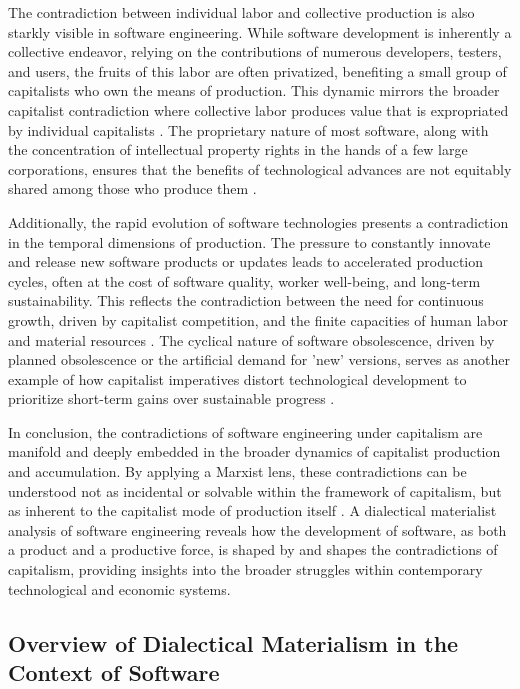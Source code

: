 \begin{refsection}
The contradiction between individual labor and collective production is also starkly visible in software engineering. While software development is inherently a collective endeavor, relying on the contributions of numerous developers, testers, and users, the fruits of this labor are often privatized, benefiting a small group of capitalists who own the means of production. This dynamic mirrors the broader capitalist contradiction where collective labor produces value that is expropriated by individual capitalists \cite[pp.~42-47]{fuchs2014}. The proprietary nature of most software, along with the concentration of intellectual property rights in the hands of a few large corporations, ensures that the benefits of technological advances are not equitably shared among those who produce them \cite[pp.~118-122]{benkler2010}.

Additionally, the rapid evolution of software technologies presents a contradiction in the temporal dimensions of production. The pressure to constantly innovate and release new software products or updates leads to accelerated production cycles, often at the cost of software quality, worker well-being, and long-term sustainability. This reflects the contradiction between the need for continuous growth, driven by capitalist competition, and the finite capacities of human labor and material resources \cite[pp.~89-93]{caffentzis2013}. The cyclical nature of software obsolescence, driven by planned obsolescence or the artificial demand for 'new' versions, serves as another example of how capitalist imperatives distort technological development to prioritize short-term gains over sustainable progress \cite[pp.~107-112]{mosco2011}.

In conclusion, the contradictions of software engineering under capitalism are manifold and deeply embedded in the broader dynamics of capitalist production and accumulation. By applying a Marxist lens, these contradictions can be understood not as incidental or solvable within the framework of capitalism, but as inherent to the capitalist mode of production itself \cite[pp.~1-25]{marx2008}. A dialectical materialist analysis of software engineering reveals how the development of software, as both a product and a productive force, is shaped by and shapes the contradictions of capitalism, providing insights into the broader struggles within contemporary technological and economic systems.

\subsection{Overview of Dialectical Materialism in the Context of Software}


\end{refsection}
